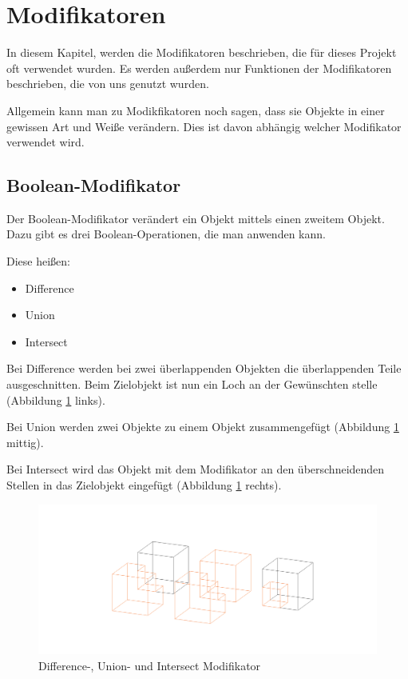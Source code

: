 \section{Modifikatoren}
In diesem Kapitel, werden die Modifikatoren beschrieben, die für dieses Projekt oft verwendet wurden.
Es werden außerdem nur Funktionen der Modifikatoren beschrieben, die von uns genutzt wurden.

Allgemein kann man zu Modikfikatoren noch sagen, dass sie Objekte in einer gewissen Art und Weiße verändern.
Dies ist davon abhängig welcher Modifikator verwendet wird.

\subsection{Boolean-Modifikator}\citep{blender:boolean_modifier}
\label{Boolean:heading}
Der Boolean-Modifikator verändert ein Objekt mittels einen zweitem Objekt. Dazu gibt es
drei Boolean-Operationen, die man anwenden kann.

Diese heißen:
\begin{itemize}
    \item  Difference
    \item  Union
    \item  Intersect
\end{itemize}

Bei Difference werden bei zwei überlappenden Objekten die überlappenden Teile ausgeschnitten. Beim Zielobjekt ist nun ein Loch an der Gewünschten stelle (Abbildung \ref{modifikatoren:image1} links).

Bei Union werden zwei Objekte zu einem Objekt zusammengefügt (Abbildung \ref{modifikatoren:image1} mittig).

Bei Intersect wird das Objekt mit dem Modifikator an den überschneidenden Stellen in das Zielobjekt eingefügt (Abbildung \ref{modifikatoren:image1} rechts).

\begin{figure}[h]
    \centering
    \includegraphics[width=.8\textwidth]{images/Modifikatoren-Boolean.png}
    \caption{Difference-, Union- und Intersect Modifikator}
    \label{modifikatoren:image1}
\end{figure}

